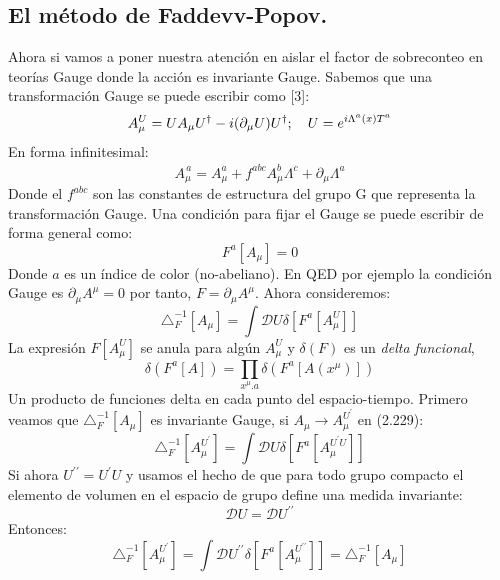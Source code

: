 \subsection{El método de Faddevv-Popov.}
Ahora si vamos a poner nuestra atención en aislar el factor de sobreconteo en teorías Gauge donde la acción es invariante Gauge. 	Sabemos que una transformación Gauge se puede escribir como [3]:
\begin{equation}
A_{\mu}^{U}=UA_{\mu}U^{\dagger}-i(\partial_{\mu}U)U^{\dagger};\ \ \ U=e^{i\text{\ensuremath{\Lambda}}^{a}(x)T^{a}}
\end{equation} 
En forma infinitesimal:
\begin{equation}
A_{\mu}^{^{^{^{^{}}}} a}=A_{\mu}^{a}+f^{abc}A_{\mu}^{b}\Lambda^{c}+\partial_{\mu}\Lambda^{a}
\end{equation}
Donde el $f^{abc}$ son las constantes de estructura del grupo G que representa la transformación Gauge. Una condición para fijar el Gauge se puede escribir de forma general como:
\begin{equation}
F^a[A_\mu]=0
\end{equation}
Donde $a$ es un índice de color (no-abeliano). En QED por ejemplo la condición Gauge es $\partial_\mu A^\mu=0$ por tanto, $F=\partial_\mu A^\mu$. Ahora consideremos:
\begin{equation}
\triangle_{F}^{-1}[A_{\mu}]=\int\mathcal{D}U\delta[F^{a}[A_{\mu}^{U}]]
\end{equation}
La expresión $F[A_{\mu}^{U}]$ se anula para algún $A_{\mu}^{U}$ y $\delta(F)$ es un 	\textit{delta funcional},
\begin{equation}
\delta(F^{a}[A])=\prod_{x^{\mu}.a}\delta(F^{a}[A(x^{\mu})])
\end{equation} 
Un producto de funciones delta en cada punto del espacio-tiempo. Primero veamos que $\triangle_{F}^{-1}[A_\mu]$ es invariante Gauge, si $A_\mu \to A_{\mu}^{U^{\prime}}$ en (2.229):
\begin{equation}
\triangle_{F}^{-1}[A_{\mu}^{U^{\prime}}]=\int\mathcal{D}U\delta[F^{a}[A_{\mu}^{U^{\prime}U}]]
\end{equation}
Si ahora $U^{\prime \prime}=U^{\prime}U$ y usamos el hecho de que para todo grupo compacto el elemento de volumen en el espacio de grupo define una medida invariante:
\begin{equation}
\mathcal{D}U=\mathcal{D}U^{\prime \prime}
\end{equation}
Entonces:
\begin{equation}
\triangle_{F}^{-1}[A_{\mu}^{U^{\prime}}]=\int\mathcal{D}U^{\prime\prime}\delta[F^{a}[A_{\mu}^{U^{\prime\prime}}]]=\triangle_{F}^{-1}[A_{\mu}]
\end{equation}
